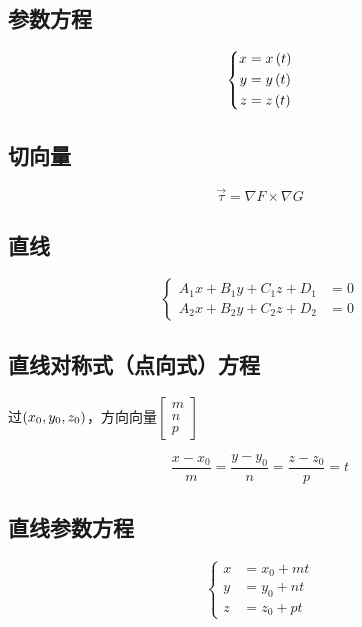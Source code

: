 \documentclass{article}
\begin{document}
\subsection{参数方程}

\[\left\{\begin{aligned}
        x & =x\left(t\right) \\
        y & =y\left(t\right) \\
        z & =z\left(t\right)
    \end{aligned}\right.\]

\subsection{切向量}

\[\vec\tau=\nabla F\times\nabla G\]

\subsection{直线}

\begin{definition}[]
    \[\left\{\begin{aligned}
            A_1x+B_1y+C_1z+D_1 & =0 \\
            A_2x+B_2y+C_2z+D_2 & =0
        \end{aligned}\right.\]
\end{definition}

\subsection{直线对称式（点向式）方程}

过$\left(x_0,y_0,z_0\right)$，方向向量$\begin{bmatrix}m\\n\\p\end{bmatrix}$

\[\frac{x-x_0}m=\frac{y-y_0}n=\frac{z-z_0}p=t\]

\subsection{直线参数方程}

\[\left\{\begin{aligned}
        x & =x_0+mt \\
        y & =y_0+nt \\
        z & =z_0+pt
    \end{aligned}\right.\]
\end{document}
